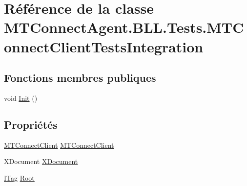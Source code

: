 \hypertarget{class_m_t_connect_agent_1_1_b_l_l_1_1_tests_1_1_m_t_connect_client_tests_integration}{}\section{Référence de la classe M\+T\+Connect\+Agent.\+B\+L\+L.\+Tests.\+M\+T\+Connect\+Client\+Tests\+Integration}
\label{class_m_t_connect_agent_1_1_b_l_l_1_1_tests_1_1_m_t_connect_client_tests_integration}
\subsection*{Fonctions membres publiques}
\begin{DoxyCompactItemize}
\item 
void \mbox{\hyperlink{class_m_t_connect_agent_1_1_b_l_l_1_1_tests_1_1_m_t_connect_client_tests_integration_a5f0afb1a4e1a699320bcbc4f5949d37c}{Init}} ()
\end{DoxyCompactItemize}
\subsection*{Propriétés}
\begin{DoxyCompactItemize}
\item 
\mbox{\hyperlink{class_m_t_connect_agent_1_1_b_l_l_1_1_m_t_connect_client}{M\+T\+Connect\+Client}} \mbox{\hyperlink{class_m_t_connect_agent_1_1_b_l_l_1_1_tests_1_1_m_t_connect_client_tests_integration_a6ff81a67a2d25bb2d74a8b64ddb17cdb}{M\+T\+Connect\+Client}}
\item 
X\+Document \mbox{\hyperlink{class_m_t_connect_agent_1_1_b_l_l_1_1_tests_1_1_m_t_connect_client_tests_integration_a1557de18252e412acb63240b6cfe6de4}{X\+Document}}
\item 
\mbox{\hyperlink{interface_m_t_connect_agent_1_1_model_1_1_i_tag}{I\+Tag}} \mbox{\hyperlink{class_m_t_connect_agent_1_1_b_l_l_1_1_tests_1_1_m_t_connect_client_tests_integration_a761a2ca9ed56072ac4edcbc21ae18983}{Root}}
\end{DoxyCompactItemize}
